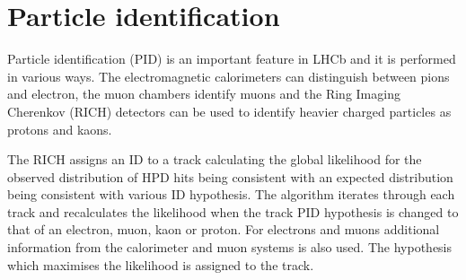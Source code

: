 \section{Particle identification}
\label{sec:PID_perf}

Particle identification (PID) is an important feature in LHCb and it is performed in various ways.
The electromagnetic calorimeters can distinguish between pions and electron, the muon chambers
identify muons and the Ring Imaging Cherenkov (RICH) detectors can be used to identify 
heavier charged particles as protons and kaons.

The RICH assigns an ID to a track calculating the global likelihood for the observed distribution 
of HPD hits being consistent with an expected distribution being consistent with various ID hypothesis.
The algorithm iterates through each track and recalculates the likelihood when the track PID hypothesis
is changed to that of an electron, muon, kaon or proton. For electrons and muons additional information
from the calorimeter and muon systems is also used. The hypothesis which maximises the likelihood
is assigned to the track.

